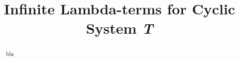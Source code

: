 \documentclass{article}[24pt]
\title{\bf Infinite Lambda-terms for Cyclic System {\em T}}
\author{}
\begin{document}
\sloppy 
{}

\maketitle
\begin{abstract}
bla
\end{abstract}



\end{document}
